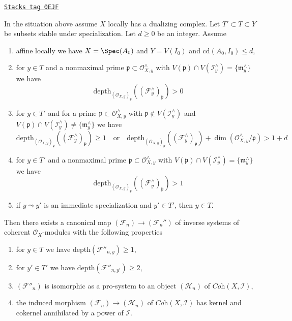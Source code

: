 \begin{lemma}
\label{algebraization-lemma-improvement-formal-coherent-module-better}
\href{https://stacks.math.columbia.edu/tag/0EJF}{\texttt{Stacks tag 0EJF}}

In the situation above assume $X$ locally has a dualizing complex.
Let $T' \subset T \subset Y$ be subsets stable under specialization.
Let $d \geq 0$ be an integer. Assume
\begin{enumerate}
\item[(a)] affine locally we have $X = \Spec(A_0)$ and $Y = V(I_0)$
and $\text{cd}(A_0, I_0) \leq d$,
\item[(b)] for $y \in T$ and a nonmaximal prime
$\mathfrak p \subset \mathcal{O}_{X, y}^\wedge$ with
$V(\mathfrak p) \cap V(\mathcal{I}_y^\wedge) = \{\mathfrak m_y^\wedge\}$
we have
$$
\text{depth}_{(\mathcal{O}_{X, y})_\mathfrak p}
((\mathcal{F}^\wedge_y)_\mathfrak p) > 0
$$
\item[(c)] for $y \in T'$ and for a prime
$\mathfrak p \subset \mathcal{O}_{X, y}^\wedge$ with
$\mathfrak p \not \in V(\mathcal{I}_y^\wedge)$
and $V(\mathfrak p) \cap V(\mathcal{I}_y^\wedge) \not =
\{\mathfrak m_y^\wedge\}$ we have
$$
\text{depth}_{(\mathcal{O}_{X, y})_\mathfrak p}
((\mathcal{F}^\wedge_y)_\mathfrak p) \geq 1
\quad\text{or}\quad
\text{depth}_{(\mathcal{O}_{X, y})_\mathfrak p}
((\mathcal{F}^\wedge_y)_\mathfrak p) +
\dim(\mathcal{O}_{X, y}^\wedge/\mathfrak p) > 1 + d
$$
\item[(d)] for $y \in T'$ and a nonmaximal prime
$\mathfrak p \subset \mathcal{O}_{X, y}^\wedge$ with
$V(\mathfrak p) \cap V(\mathcal{I}_y^\wedge) = \{\mathfrak m_y^\wedge\}$
we have
$$
\text{depth}_{(\mathcal{O}_{X, y})_\mathfrak p}
((\mathcal{F}^\wedge_y)_\mathfrak p) > 1
$$
\item[(e)] if $y \leadsto y'$ is an immediate specialization and
$y' \in T'$, then $y \in T$.
\end{enumerate}
Then there exists a canonical map $(\mathcal{F}_n) \to (\mathcal{F}_n'')$
of inverse systems of coherent $\mathcal{O}_X$-modules
with the following properties
\begin{enumerate}
\item for $y \in T$ we have $\text{depth}(\mathcal{F}''_{n, y}) \geq 1$,
\item for $y' \in T'$ we have $\text{depth}(\mathcal{F}''_{n, y'}) \geq 2$,
\item $(\mathcal{F}''_n)$ is isomorphic as a pro-system to an object
$(\mathcal{H}_n)$ of $\textit{Coh}(X, \mathcal{I})$,
\item the induced morphism $(\mathcal{F}_n) \to (\mathcal{H}_n)$ of
$\textit{Coh}(X, \mathcal{I})$ has kernel and cokernel
annihilated by a power of $\mathcal{I}$.
\end{enumerate}
\end{lemma}

